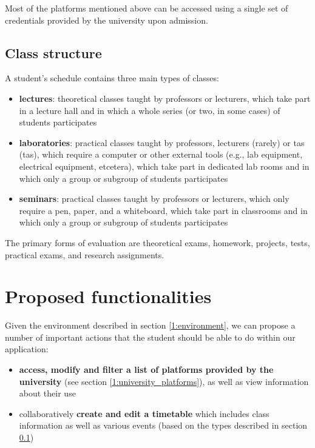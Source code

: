         Most of the platforms mentioned above can be accessed using a single set of credentials provided by the university upon admission.
        
    \subsection{Class structure} \label{1:class_structure}
    
    A student's schedule contains three main types of classes:
    
    \begin{itemize}
        \setlength{\topsep}{0.5pt}
        \setlength{\itemsep}{0.5pt}
        \setlength{\parsep}{0.5pt}
        \item \textbf{lectures}: theoretical classes taught by professors or lecturers, which take part in a lecture hall and in which a whole series (or two, in some cases) of students participates
        \item \textbf{laboratories}: practical classes taught by professors, lecturers (rarely) or \acrshort{ta}s (\acrlong{ta}s), which require a computer or other external tools (e.g., lab equipment, electrical equipment, etcetera), which take part in dedicated lab rooms and in which only a group or subgroup of students participates
        \item \textbf{seminars}: practical classes taught by professors or lecturers, which only require a pen, paper, and a whiteboard, which take part in classrooms and in which only a group or subgroup of students participates
    \end{itemize}
    
    The primary forms of evaluation are theoretical exams, homework, projects, tests, practical exams, and research assignments.
        
\section{Proposed functionalities} \label{1:functionalities}

    Given the environment described in section \ref{1:environment}, we can propose a number of important actions that the student should be able to do within our application:
    
    \begin{itemize}
        \setlength{\topsep}{0.5pt}
        \setlength{\itemsep}{0.5pt}
        \setlength{\parsep}{0.5pt}
        \item \textbf{access, modify and filter a list of platforms provided by the university} (see section \ref{1:university_platforms}), as well as view information about their use
        \item collaboratively \textbf{create and edit a timetable} which includes class information as well as various events (based on the types described in section \ref{1:class_structure})
    \end{itemize}
    

